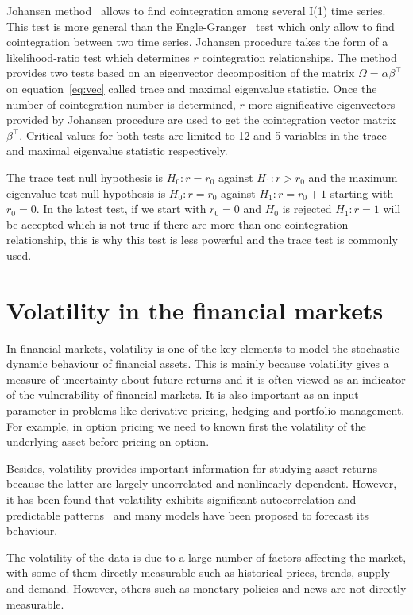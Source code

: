 Johansen method~\cite{johansen1988} allows to find cointegration among several
I(1) time series. This test is more general than the
Engle-Granger~\cite{engle1987} test which only allow to find cointegration
between two time series.  Johansen procedure takes the form of a
likelihood-ratio test which determines $r$ cointegration relationships. The
method provides two tests based on an eigenvector decomposition of the matrix
$\Omega = \alpha \beta^\top$ on equation~\ref{eq:vec} called trace and maximal
eigenvalue statistic.  Once the number of cointegration number is determined,
$r$ more significative eigenvectors provided by Johansen procedure are used to
get the cointegration vector matrix $\beta^\top$.  Critical values for both
tests are limited to 12 and 5 variables in the trace and maximal eigenvalue
statistic respectively.

The trace test null hypothesis is $H_0: r = r_0$ against $H_1: r > r_0$ and the
maximum eigenvalue test null hypothesis is $H_0: r = r_0$ against $H_1: r =
r_0+1$ starting with $r_0 = 0$.  In the latest test, if we start with $r_0=0$
and $H_0$ is rejected $H_1: r = 1$ will be accepted which is not true if there
are more than one cointegration relationship, this is why this test is less
powerful and the trace test is commonly used.



\section{Volatility in the financial markets}
In financial markets, volatility is one of the key elements to model the
stochastic dynamic behaviour of financial assets. This is mainly because
volatility gives a measure of uncertainty about future returns and it is often
viewed as an indicator of the vulnerability of financial markets. It is also
important as an input parameter in problems like derivative pricing, hedging
and portfolio management.  For example, in option pricing we need to known
first the volatility of the underlying asset before pricing an option. 

Besides, volatility provides important information for studying asset returns
because the latter are largely uncorrelated and nonlinearly dependent. However,
it has been found that volatility exhibits significant autocorrelation and
predictable patterns~\cite{poon+granger2003} and  many models have been
proposed to forecast its behaviour. 

The volatility of the data is due to a large number of factors affecting the
market, with some of them directly measurable such as historical prices,
trends, supply and demand. However, others such as monetary policies and news
are not directly measurable.

